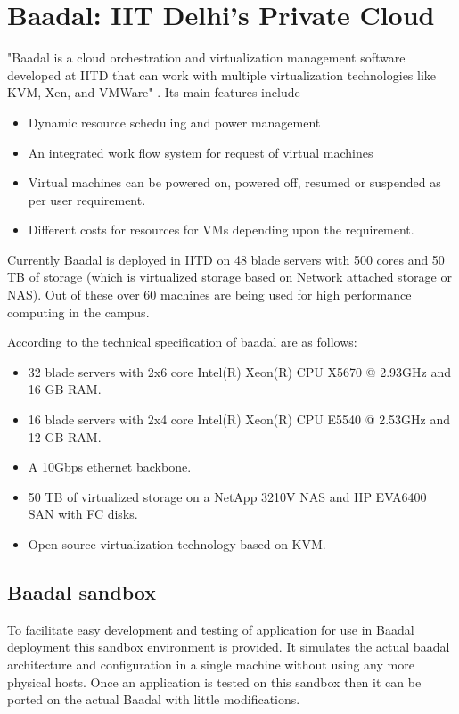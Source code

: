 \section{Baadal: IIT Delhi's Private Cloud}
"Baadal is a cloud orchestration and virtualization management software developed at IITD that can work with multiple virtualization technologies like KVM, Xen, and VMWare" \cite{baadaliitd}. Its main features include
\begin{itemize}
    \item Dynamic resource scheduling and power management
    \item An integrated work flow system for request of virtual machines
    \item Virtual machines can be powered on, powered off, resumed or suspended as per user requirement.
    \item Different costs for resources for VMs depending upon the requirement.
\end{itemize}

Currently Baadal is deployed in IITD on 48 blade servers with 500 cores and 50 TB of storage (which is virtualized storage based on Network attached storage or NAS). Out of these over 60 machines are being used for high performance computing in the campus.

According to \cite{baadaliitdwebpage} the technical specification of baadal are as follows:
\begin{itemize} 
    \item 32 blade servers with 2x6 core Intel(R) Xeon(R) CPU X5670 @ 2.93GHz and 16 GB RAM.
    \item 16 blade servers with 2x4 core Intel(R) Xeon(R) CPU E5540 @ 2.53GHz and 12 GB RAM.
    \item A 10Gbps ethernet backbone.
    \item 50 TB of virtualized storage on a NetApp 3210V NAS and HP EVA6400 SAN with FC disks.
    \item Open source virtualization technology based on KVM.
\end{itemize}

\subsection{Baadal sandbox}
To facilitate easy development and testing of application for use in Baadal deployment this sandbox environment is provided. It simulates the actual baadal architecture and configuration in a single machine without using any more physical hosts. Once an application is tested on this sandbox then it can be ported on the actual Baadal with little modifications.

